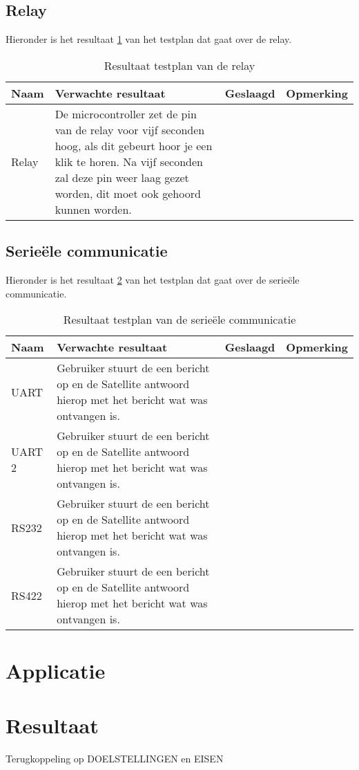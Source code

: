 \newpage
\subsection{Relay}
Hieronder is het resultaat \ref{tab:resultaatrelay}  van het testplan dat gaat over de relay.
\begin{table}[h!]
	\caption{Resultaat testplan van de relay}
	\begin{tabular}{lp{8.5cm}lp{4cm}}
	\toprule
	\textbf{Naam} 	& \textbf{Verwachte resultaat} & \textbf{Geslaagd} & \textbf{Opmerking} \\ \toprule
	Relay			& De microcontroller zet de pin van de relay voor vijf seconden hoog, als dit gebeurt hoor je een klik te horen. Na vijf seconden zal deze pin weer laag gezet worden, dit moet ook gehoord kunnen worden.\\  \bottomrule
	\end{tabular}
	\label{tab:resultaatrelay}
\end{table}


\subsection{Serieële communicatie}
Hieronder is het resultaat \ref{tab:resultaatserieel} van het testplan dat gaat over de serieële communicatie.
\begin{table}[h!]
	\caption{Resultaat testplan van de serieële communicatie}
	\begin{tabular}{lp{8.5cm}lp{4cm}}
	\toprule
	\textbf{Naam} 	& \textbf{Verwachte resultaat} & \textbf{Geslaagd} & \textbf{Opmerking} \\ \toprule
	UART & Gebruiker stuurt de een bericht op en de Satellite antwoord hierop met het bericht wat was ontvangen is.&& \\
	UART 2 & Gebruiker stuurt de een bericht op en de Satellite antwoord hierop met het bericht wat was ontvangen is.&& \\
	RS232 & Gebruiker stuurt de een bericht op en de Satellite antwoord hierop met het bericht wat was ontvangen is.&&\\
	RS422 & Gebruiker stuurt de een bericht op en de Satellite antwoord hierop met het bericht wat was ontvangen is.&&\\ \bottomrule
	\end{tabular}
	\label{tab:resultaatserieel}
\end{table}

\section{Applicatie}

\section{Resultaat}
Terugkoppeling op  DOELSTELLINGEN en EISEN